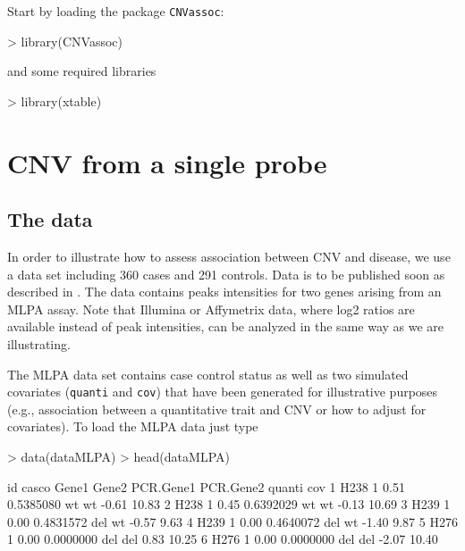 \documentclass[11pt]{article}
\begin{document}
\noindent Start by loading the package \texttt{CNVassoc}:



\begin{Schunk}
\begin{Sinput}
> library(CNVassoc)
\end{Sinput}
\end{Schunk}

\noindent and some required libraries
\begin{Schunk}
\begin{Sinput}
> library(xtable)
\end{Sinput}
\end{Schunk}





\section{CNV from a single probe} \label{section-CNV from a single probe}


\subsection{The data}

In order to illustrate how to assess association between CNV and disease, we use a data set including 360 cases and 291 controls. 
Data is to be published soon as described in \cite{GonSubEsc09}. The data contains peaks intensities for two genes arising from an MLPA assay.
Note that Illumina or Affymetrix data, where log2 ratios are available instead of peak intensities, 
can be analyzed in the same way as we are illustrating.

The MLPA data set contains case control status as well as two simulated covariates ({\tt quanti} and {\tt cov}) that have been generated 
for illustrative purposes (e.g., association between a quantitative trait and CNV or how to adjust for covariates). 
To load the MLPA data just type

\begin{Schunk}
\begin{Sinput}
> data(dataMLPA)
> head(dataMLPA)
\end{Sinput}
\begin{Soutput}
    id casco Gene1     Gene2 PCR.Gene1 PCR.Gene2 quanti   cov
1 H238     1  0.51 0.5385080        wt        wt  -0.61 10.83
2 H238     1  0.45 0.6392029        wt        wt  -0.13 10.69
3 H239     1  0.00 0.4831572       del        wt  -0.57  9.63
4 H239     1  0.00 0.4640072       del        wt  -1.40  9.87
5 H276     1  0.00 0.0000000       del       del   0.83 10.25
6 H276     1  0.00 0.0000000       del       del  -2.07 10.40
\end{Soutput}
\end{Schunk}
\end{document}
